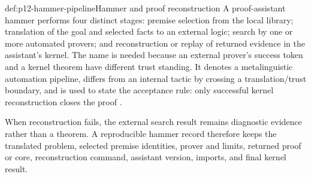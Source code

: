 \begin{hbdefinition}{def:p12-hammer-pipeline}{Hammer and proof reconstruction}
A proof-assistant hammer performs four distinct stages: premise selection from
the local library; translation of the goal and selected facts to an external
logic; search by one or more automated provers; and reconstruction or replay
of returned evidence in the assistant's kernel. The name is needed because an
external prover's success token and a kernel theorem have different trust
standing. It denotes a metalinguistic automation pipeline, differs from an
internal tactic by crossing a translation/trust boundary, and is used to state
the acceptance rule: only successful kernel reconstruction closes the proof
\cite{BlanchetteEtAl2016Hammering}.
\end{hbdefinition}

When reconstruction fails, the external search result remains diagnostic
evidence rather than a theorem. A reproducible hammer record therefore keeps
the translated problem, selected premise identities, prover and limits,
returned proof or core, reconstruction command, assistant version, imports,
and final kernel result.

